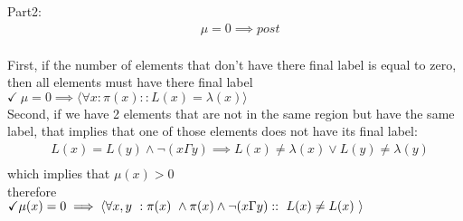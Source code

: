 \documentclass{article}
\begin{document}
\begin{enumerate}
\iffalse
\begin{align*}
&\emph{Let's say that:}\\
&\pi(x)=(i,j) \wedge L(x)\neq \lambda(x) \wedge \pi(y)=(p,q) \wedge L(y)=\lambda(y)\\
&\emph{then}\\
&L(i,j) := min(L(i,j),L(p,q)) \ if \ SameRegion((i,j),(p,q)) \ ensures \ L(x)=\lambda(x)\\
&\emph{and}\\
&\langle \forall x \ : \pi(x)=(i,j) \ :: \exists \ i,j : 0 \leq i,j \leq N :: L(x)=\lambda(x) \ \rangle\\
\end{align*}
meaning that if x does not have its final label and y does have its final label, then we can select the assignment statement that takes x and y, and this statement ensures that $\mu$ decreases.\\
Additionally, there always exists such a $y$ that $L(y)=\lambda(y)$, because at least one element is set to the minimum label in its region.\\
\fi

Part2:\\
\begin{align*}
&\mu = 0 \implies post\\
\end{align*}

First, if the number of elements that don't have there final label is equal to zero, then all elements must have there final label\\
$\checkmark \ \mu = 0 \implies \langle \forall x : \pi(x) :: L(x)=\lambda(x) \rangle$\\

Second, if we have 2 elements that are not in the same region but have the same label, that implies that one of those elements does not have its final label:\\
\begin{align*}
&L(x) = L(y) \wedge \neg(x \Gamma y) \implies L(x)\neq\lambda(x) \vee L(y)\neq \lambda(y)\\
\end{align*}
which implies that
$\mu(x) > 0$\\
therefore\\
$\checkmark \mu(x)=0 \implies  \langle \forall x,y \ : \pi(x) \ \wedge \pi(x) \wedge \neg(x \Gamma y) :: \ L(x) \neq L(x)  \ \rangle\\$



\end{enumerate}
\end{document}
